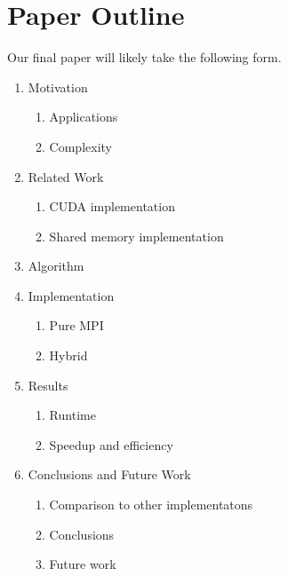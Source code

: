 \section{Paper Outline}

Our final paper will likely take the following form.

\begin{enumerate}[I]
\item Motivation
\begin{enumerate}[i]
\item Applications
\item Complexity
\end{enumerate}
\item Related Work
\begin{enumerate}[i]
\item CUDA implementation
\item Shared memory implementation
\end{enumerate}
\item Algorithm
\item Implementation
\begin{enumerate}[i]
\item Pure MPI
\item Hybrid
\end{enumerate}
\item Results
\begin{enumerate}[i]
\item Runtime
\item Speedup and efficiency
\end{enumerate}
\item Conclusions and Future Work
\begin{enumerate}[i]
\item Comparison to other implementatons
\item Conclusions
\item Future work
\end{enumerate}
\end{enumerate}

